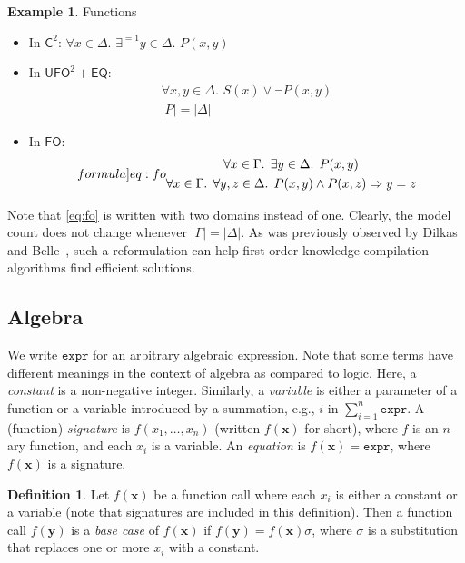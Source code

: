 \documentclass{article}
\theoremstyle{definition}
\newtheorem{definition}{Definition}
\newtheorem{example}{Example}
\newcommand{\expr}{\mathtt{expr}}
\newcommand{\Ctwo}{$\mathsf{C}^{2}$}
\newcommand{\FO}{$\mathsf{FO}$}
\newcommand{\UFO}{$\mathsf{UFO}^{2} + \mathsf{EQ}$}
\begin{document}
\begin{example}\label{example:functions}
  Functions
  \begin{itemize}
    \item In \Ctwo: $\forall x \in \Delta\text{.
          }\exists^{=1} y \in \Delta\text{. }P(x, y)$
    \item In \UFO:
          \begin{gather*}
            \forall x, y \in \Delta\text{. }S(x) \lor \neg P(x, y)\\
            |P| = |\Delta|
          \end{gather*}
    \item In \FO:
    \begin{equation}\label[formula]{eq:fo}
      \begin{gathered}
        \forall x \in \Gamma\text{. }\exists y \in \Delta\text{. }P(x, y)\\
        \forall x \in \Gamma\text{. }\forall y, z \in \Delta\text{. }P(x, y) \land P(x, z) \Rightarrow y = z
      \end{gathered}
    \end{equation}
  \end{itemize}

  Note that \cref{eq:fo} is written with two domains instead of one. Clearly,
  the model count does not change whenever $|\Gamma| = |\Delta|$. As was
  previously observed by Dilkas and Belle~,
  such a reformulation can help first-order knowledge compilation algorithms
  find efficient solutions.
\end{example}

\subsection{Algebra}\label{sec:algebra}

We write $\expr{}$ for an arbitrary algebraic expression. Note that some terms
have different meanings in the context of algebra as compared to logic. Here, a
\emph{constant} is a non-negative integer. Similarly, a \emph{variable} is
either a parameter of a function or a variable introduced by a summation, e.g.,
$i$ in $\sum_{i=1}^{n} \expr$. A (function) \emph{signature} is
$f(x_{1}, \dots, x_{n})$ (written $f(\mathbf{x})$ for short), where $f$ is an
$n$-ary function, and each $x_{i}$ is a variable. An \emph{equation} is
$f(\mathbf{x}) = \expr{}$, where $f(\mathbf{x})$ is a signature.

\begin{definition}\label{def:basecase}
  Let $f(\mathbf{x})$ be a function call where each $x_{i}$ is either a constant
  or a variable (note that signatures are included in this definition). Then a
  function call $f(\mathbf{y})$ is a \emph{base case} of $f(\mathbf{x})$ if
  $f(\mathbf{y}) = f(\mathbf{x})\sigma$, where $\sigma$ is a substitution that
  replaces one or more $x_{i}$ with a constant.
\end{definition}
\end{document}
